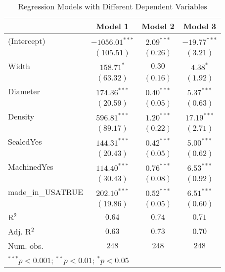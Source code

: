 
\begin{table}
\begin{center}
\begin{tabular}{l c c c}
\hline
 & Model 1 & Model 2 & Model 3 \\
\hline
(Intercept)       & $-1056.01^{***}$ & $2.09^{***}$ & $-19.77^{***}$ \\
                  & $(105.51)$       & $(0.26)$     & $(3.21)$       \\
Width             & $158.71^{*}$     & $0.30$       & $4.38^{*}$     \\
                  & $(63.32)$        & $(0.16)$     & $(1.92)$       \\
Diameter          & $174.36^{***}$   & $0.40^{***}$ & $5.37^{***}$   \\
                  & $(20.59)$        & $(0.05)$     & $(0.63)$       \\
Density           & $596.81^{***}$   & $1.20^{***}$ & $17.19^{***}$  \\
                  & $(89.17)$        & $(0.22)$     & $(2.71)$       \\
SealedYes         & $144.31^{***}$   & $0.42^{***}$ & $5.00^{***}$   \\
                  & $(20.43)$        & $(0.05)$     & $(0.62)$       \\
MachinedYes       & $114.40^{***}$   & $0.76^{***}$ & $6.53^{***}$   \\
                  & $(30.43)$        & $(0.08)$     & $(0.92)$       \\
made\_in\_USATRUE & $202.10^{***}$   & $0.52^{***}$ & $6.51^{***}$   \\
                  & $(19.86)$        & $(0.05)$     & $(0.60)$       \\
\hline
R$^2$             & $0.64$           & $0.74$       & $0.71$         \\
Adj. R$^2$        & $0.63$           & $0.73$       & $0.70$         \\
Num. obs.         & $248$            & $248$        & $248$          \\
\hline
\multicolumn{4}{l}{\scriptsize{$^{***}p<0.001$; $^{**}p<0.01$; $^{*}p<0.05$}}
\end{tabular}
\caption{Regression Models with Different Dependent Variables}
\label{tab:reg_by_dep_var}
\end{center}
\end{table}
